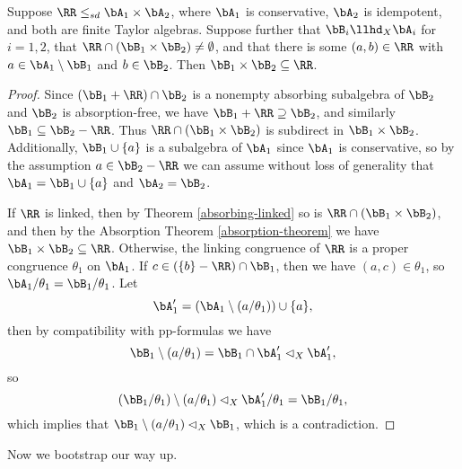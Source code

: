 \begin{lem} Suppose $\RR \le_{sd} \bA_1 \times \bA_2$, where $\bA_1$ is conservative, $\bA_2$ is idempotent, and both are finite Taylor algebras. Suppose further that $\bB_i \llhd_X \bA_i$ for $i=1,2$, that $\RR \cap (\bB_1 \times \bB_2) \ne \emptyset$, and that there is some $(a,b) \in \RR$ with $a \in \bA_1\setminus\bB_1$ and $b \in \bB_2$. Then $\bB_1 \times \bB_2 \subseteq \RR$.
\end{lem}
\begin{proof} Since $(\bB_1 + \RR) \cap \bB_2$ is a nonempty absorbing subalgebra of $\bB_2$ and $\bB_2$ is absorption-free, we have $\bB_1 + \RR \supseteq \bB_2$, and similarly $\bB_1 \subseteq \bB_2 - \RR$. Thus $\RR \cap (\bB_1 \times \bB_2)$ is subdirect in $\bB_1 \times \bB_2$. Additionally, $\bB_1 \cup \{a\}$ is a subalgebra of $\bA_1$ since $\bA_1$ is conservative, so by the assumption $a \in \bB_2 - \RR$ we can assume without loss of generality that $\bA_1 = \bB_1 \cup \{a\}$ and $\bA_2 = \bB_2$.

If $\RR$ is linked, then by Theorem \ref{absorbing-linked} so is $\RR \cap (\bB_1 \times \bB_2)$, and then by the Absorption Theorem \ref{absorption-theorem} we have $\bB_1 \times \bB_2 \subseteq \RR$. Otherwise, the linking congruence of $\RR$ is a proper congruence $\theta_1$ on $\bA_1$. If $c \in (\{b\} - \RR) \cap \bB_1$, then we have $(a,c) \in \theta_1$, so $\bA_1/\theta_1 = \bB_1/\theta_1$. Let
\[
\bA_1' = (\bA_1 \setminus (a/\theta_1)) \cup \{a\},
\]
then by compatibility with pp-formulas we have
\[
\bB_1 \setminus (a/\theta_1) = \bB_1 \cap \bA_1' \lhd_X \bA_1',
\]
so
\[
(\bB_1/\theta_1) \setminus (a/\theta_1) \lhd_X \bA_1'/\theta_1 = \bB_1/\theta_1,
\]
which implies that $\bB_1 \setminus (a/\theta_1) \lhd_X \bB_1$, which is a contradiction.
\end{proof}

Now we bootstrap our way up.

